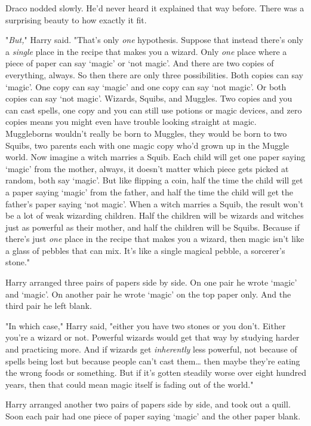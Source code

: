 Draco nodded slowly. He'd never heard it explained that way before. There was a
surprising beauty to how exactly it fit.

"\emph{But,}" Harry said. "That's only \emph{one} hypothesis. Suppose that
instead there's only a \emph{single} place in the recipe that makes you a
wizard. Only \emph{one} place where a piece of paper can say `magic' or `not
magic'. And there are two copies of everything, always. So then there are only
three possibilities. Both copies can say `magic'. One copy can say `magic' and
one copy can say `not magic'. Or both copies can say `not magic'. Wizards,
Squibs, and Muggles. Two copies and you can cast spells, one copy and you can
still use potions or magic devices, and zero copies means you might even have
trouble looking straight at magic. Muggleborns wouldn't really be born to
Muggles, they would be born to two Squibs, two parents each with one magic copy
who'd grown up in the Muggle world. Now imagine a witch marries a Squib. Each
child will get one paper saying `magic' from the mother, always, it doesn't
matter which piece gets picked at random, both say `magic'. But like flipping a
coin, half the time the child will get a paper saying `magic' from the father,
and half the time the child will get the father's paper saying `not magic'.
When a witch marries a Squib, the result won't be a lot of weak wizarding
children. Half the children will be wizards and witches just as powerful as
their mother, and half the children will be Squibs. Because if there's just
\emph{one} place in the recipe that makes you a wizard, then magic isn't like a
glass of pebbles that can mix. It's like a single magical pebble, a sorcerer's
stone."

Harry arranged three pairs of papers side by side. On one pair he wrote `magic'
and `magic'. On another pair he wrote `magic' on the top paper only. And the
third pair he left blank.

"In which case," Harry said, "either you have two stones or you don't. Either
you're a wizard or not. Powerful wizards would get that way by studying harder
and practicing more. And if wizards get \emph{inherently} less powerful, not
because of spells being lost but because people can't cast them{\ldots} then
maybe they're eating the wrong foods or something. But if it's gotten steadily
worse over eight hundred years, then that could mean magic itself is fading out
of the world."

Harry arranged another two pairs of papers side by side, and took out a quill.
Soon each pair had one piece of paper saying `magic' and the other paper blank.

